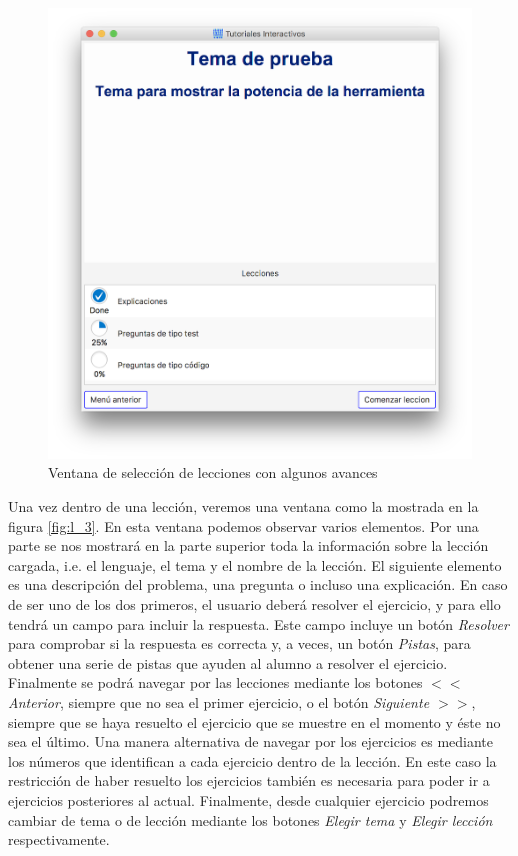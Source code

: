\documentclass[]{article}
\begin{document}
%
\begin{figure}[tbp]
\begin{center}
\includegraphics[scale=0.35]{l_2.png}
\end{center}
\caption{Ventana de selección de lecciones con algunos avances\label{fig:l_2}}
\end{figure}
%

Una vez dentro de una lección, veremos una ventana como la mostrada en la figura \ref{fig:l_3}. En esta ventana podemos observar varios elementos. Por una parte se nos mostrará en la parte superior toda la información sobre la lección cargada, i.e. el lenguaje, el tema y el nombre de la lección. El siguiente elemento es una descripción del problema, una pregunta o incluso una explicación. En caso de ser uno de los dos primeros, el usuario deberá resolver el ejercicio, y para ello tendrá un campo para incluir la respuesta. Este campo incluye un botón \emph{Resolver} para comprobar si la respuesta es correcta y, a veces, un botón \emph{Pistas}, para obtener una serie de pistas que ayuden al alumno a resolver el ejercicio. Finalmente se podrá navegar por las lecciones mediante los botones \emph{$<<$ Anterior}, siempre que no sea el primer ejercicio, o el botón \emph{Siguiente $>>$}, siempre que se haya resuelto el ejercicio que se muestre en el momento y éste no sea el último. Una manera alternativa de navegar por los ejercicios es mediante los números que identifican a cada ejercicio dentro de la lección. En este caso la restricción de haber resuelto los ejercicios también es necesaria para poder ir a ejercicios posteriores al actual. Finalmente, desde cualquier ejercicio podremos cambiar de tema o de lección mediante los botones \emph{Elegir tema} y \emph{Elegir lección} respectivamente.  
\end{document}
